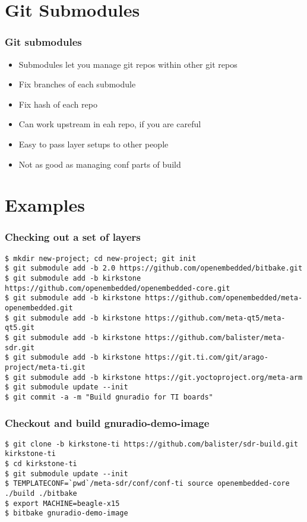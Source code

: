 \documentclass{beamer}
\begin{document}
\section{Git Submodules}

\begin{frame}
\frametitle{Git submodules}

\begin{itemize}
\item Submodules let you manage git repos within other git repos
\item Fix branches of each submodule
\item Fix hash of each repo
\item Can work upstream in eah repo, if you are careful
\item Easy to pass layer setups to other people
\item Not as good as managing conf parts of build
\end{itemize}

\end{frame}

\section{Examples}

\begin{frame}[fragile]
\frametitle{Checking out a set of layers}

\begin{Verbatim}[fontsize=\tiny]
$ mkdir new-project; cd new-project; git init
$ git submodule add -b 2.0 https://github.com/openembedded/bitbake.git
$ git submodule add -b kirkstone https://github.com/openembedded/openembedded-core.git
$ git submodule add -b kirkstone https://github.com/openembedded/meta-openembedded.git
$ git submodule add -b kirkstone https://github.com/meta-qt5/meta-qt5.git
$ git submodule add -b kirkstone https://github.com/balister/meta-sdr.git
$ git submodule add -b kirkstone https://git.ti.com/git/arago-project/meta-ti.git
$ git submodule add -b kirkstone https://git.yoctoproject.org/meta-arm
$ git submodule update --init
$ git commit -a -m "Build gnuradio for TI boards"
\end{Verbatim}

\end{frame}

\begin{frame}[fragile]
\frametitle{Checkout and build gnuradio-demo-image}

\begin{Verbatim}[fontsize=\tiny]
$ git clone -b kirkstone-ti https://github.com/balister/sdr-build.git kirkstone-ti
$ cd kirkstone-ti
$ git submodule update --init
$ TEMPLATECONF=`pwd`/meta-sdr/conf/conf-ti source openembedded-core ./build ./bitbake
$ export MACHINE=beagle-x15
$ bitbake gnuradio-demo-image
\end{Verbatim}

\end{frame}
\end{document}
